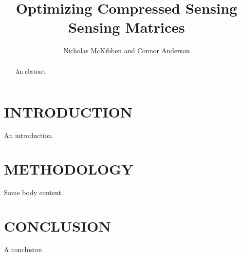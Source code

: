 \documentclass[journal]{IEEEtran}
\title{Optimizing Compressed Sensing Sensing Matrices}
\author{Nicholas McKibben and Connor Anderson}
\begin{document}
\maketitle
\thispagestyle{empty}
\pagestyle{empty}
\begin{abstract}

An abstract

\end{abstract}
\section{INTRODUCTION}

An introduction.

\section{METHODOLOGY}

Some body content.

\section{CONCLUSION}

A conclusion



{}
\end{document}
